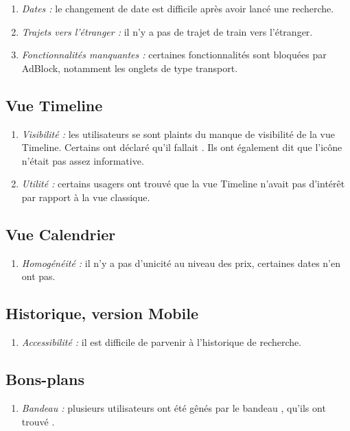 \begin{enumerate}
\item {\em Dates : } le changement de date est difficile apr\`{e}s avoir lanc\'{e} une recherche.
\item {\em Trajets vers l'\'{e}tranger : } il n'y a pas de trajet de train vers l'\'{e}tranger.
\item {\em Fonctionnalit\'{e}s manquantes : } certaines fonctionnalit\'{e}s sont bloqu\'{e}es par AdBlock, notamment les onglets de type transport.
\end{enumerate}

\subsection{Vue Timeline}

\begin{enumerate}
\item {\em Visibilit\'{e} : } les utilisateurs se sont plaints du manque de visibilit\'{e} de la vue Timeline. Certains ont d\'{e}clar\'{e} qu'il fallait . Ils ont \'{e}galement dit que l'ic\^{o}ne n'\'{e}tait pas assez informative.
\item {\em Utilit\'{e} : } certains usagers ont trouv\'{e} que la vue Timeline n'avait pas d'int\'{e}r\^{e}t par rapport \`{a} la vue classique.
\end{enumerate}

\subsection{Vue Calendrier}

\begin{enumerate}
\item {\em Homog\'{e}n\'{e}it\'{e} : } il n'y a pas d'unicit\'{e} au niveau des prix, certaines dates n'en ont pas.
\end{enumerate}

\subsection{Historique, version Mobile}

\begin{enumerate}
\item {\em Accessibilit\'{e} : } il est difficile de parvenir \`{a} l'historique de recherche.
\end{enumerate}

\subsection{Bons-plans}

\begin{enumerate}
\item {\em Bandeau : } plusieurs utilisateurs ont \'{e}t\'{e} g\^{e}n\'{e}s par le bandeau , qu'ils ont trouv\'{e} .
\end{enumerate}